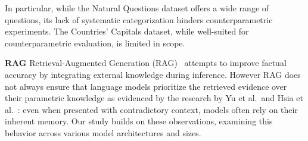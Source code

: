 In particular, while the Natural Questions dataset offers a wide range of questions, its lack of systematic categorization hinders counterparametric experiments.
The Countries' Capitals dataset, while well-suited for counterparametric evaluation, is limited in scope.

\textbf{RAG}
Retrieval-Augmented Generation (RAG)~\cite{rag} attempts to improve factual accuracy by integrating external knowledge during inference.
However RAG does not always ensure that language models prioritize the retrieved evidence over their parametric knowledge as evidenced by the research by Yu et al.\ and Hsia et al.~\cite{ragged,factual_recall}: even when presented with contradictory context, models often rely on their inherent memory.
Our study builds on these observations, examining this behavior across various model architectures and sizes.
